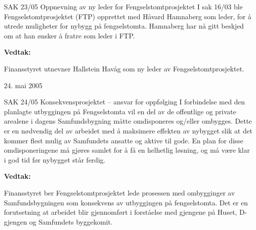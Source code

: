 \begin{instruksledd}{SAK 23/05 Oppnevning av ny leder for Fengselstomtprosjektet}
    I sak 16/03 ble Fengselstomtprosjektet (FTP) opprettet med Håvard Hamnaberg som leder,
    for å utrede muligheter for
    nybygg på fengselstomta. Hamnaberg har nå gitt beskjed om at han ønsker å fratre som
    leder i FTP.

    \textbf{Vedtak:}

    Finansstyret utnevner Hallstein Havåg som ny leder av Fengselstomtprosjektet.
    
    24. mai 2005
\end{instruksledd}
\begin{instruksledd}{SAK 24/05 Konsekvensprosjektet – ansvar for oppfølging}
    I forbindelse med den planlagte utbyggingen på Fengselstomta vil en del av de
    offentlige og private arealene i dagens
    Samfundsbygning måtte omdisponeres og/eller ombygges. Dette er en nødvendig del av
    arbeidet med å maksimere
    effekten av nybygget slik at det kommer flest mulig av Samfundets ansatte og aktive
    til gode. En plan for disse
    omdisponeringene må gjøres samlet for å få en helhetlig løsning, og må være klar i god
    tid før nybygget står ferdig.

    \textbf{Vedtak:}

    Finansstyret ber Fengselstomtprosjektet lede prosessen med ombygginger av
    Samfundsbygningen som konsekvens av
    utbyggingen på fengselstomta. Det er en forutsetning at arbeidet blir gjennomført i
    forståelse med gjengene på Huset, D-gjengen og Samfundets byggekomit.
\end{instruksledd}


\clearpage


